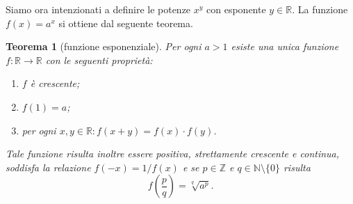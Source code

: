 \documentclass[italian,a4paper,oneside,headinclude]{scrbook}
\newcommand{\NN}{\mathbb N}
\newcommand{\RR}{\mathbb R}
\newcommand{\ZZ}{\mathbb Z}
\newcommand{\enclose}[1]{{\left( #1 \right)}}
\newtheorem{theorem}{Teorema}
\begin{document}
Siamo ora intenzionati a definire le potenze $x^y$ con esponente $y\in \RR$.
La funzione $f(x) = a^x$ si ottiene dal seguente teorema.

\begin{theorem}[funzione esponenziale]
Per ogni $a>1$ esiste una unica funzione $f\colon \RR \to \RR$
con le seguenti proprietà:
\begin{enumerate}
\item $f$ è crescente;
\item $f(1) = a$;
\item per ogni $x,y\in \RR\colon f(x+y) = f(x)\cdot f(y)$.
\end{enumerate}
Tale funzione risulta inoltre essere positiva,
strettamente crescente e
continua, soddisfa la relazione $f(-x)= 1/f(x)$ e
se $p\in \ZZ$ e $q\in \NN\setminus\{0\}$ risulta
\[
  f\enclose{\frac p q} = \sqrt[q]{a^p}.
\]
\end{theorem}
%
\end{document}

